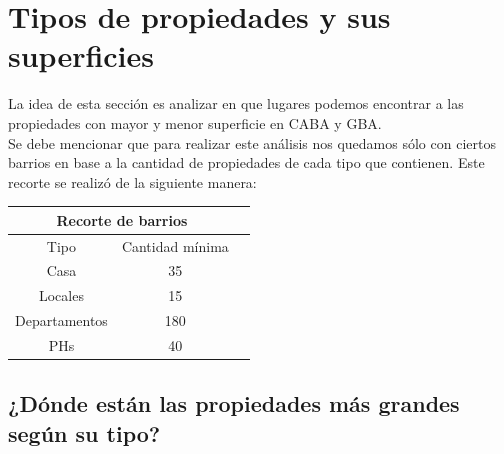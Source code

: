\documentclass[a4paper, 10pt]{article}
\newcommand\tab[1][0.5cm]{\hspace*{#1}}
\begin{document}
		\section{Tipos de propiedades y sus superficies}
			La idea de esta sección es analizar en que lugares podemos encontrar a las propiedades con mayor y menor superficie
			en CABA y GBA. \\
			\tab Se debe mencionar que para realizar este análisis nos quedamos sólo con ciertos barrios en base a la cantidad de
			propiedades de cada tipo que contienen. Este recorte se realizó de la siguiente manera:
			\begin{center}
				\begin{tabular}{ |c|c|c| }
					\hline
					\multicolumn{2}{|c|}{Recorte de barrios}\\
					\hline
					\hline
					Tipo & Cantidad mínima \\
					\hline
					Casa & 35\\
					Locales & 15\\
					Departamentos & 180\\
					PHs & 40\\
					\hline
				\end{tabular}
			\end{center}
			\subsection{¿Dónde están las propiedades más grandes según su tipo?}
\end{document}
